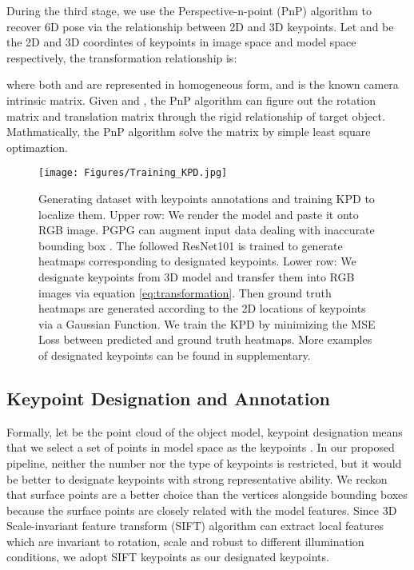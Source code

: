 \documentclass[10pt,twocolumn,letterpaper]{article}
\begin{document}
During the third stage, we use the Perspective-n-point (PnP) \cite{Lepetit2008EPnPAA} algorithm to recover 6D pose via the relationship between 2D and 3D keypoints. Let  and  be the 2D and 3D coordintes of keypoints in image space and model space respectively, the transformation relationship is:

where both  and  are represented in homogeneous form, and  is the known camera intrinsic matrix. Given  and , the PnP algorithm can figure out the rotation matrix  and translation matrix  through the rigid relationship of target object. Mathmatically, the PnP algorithm solve the matrix  by simple least square optimaztion.

\begin{figure*}[t]
\begin{center}
   \texttt{[image: Figures/Training\_KPD.jpg]}
\end{center}
   \caption{Generating dataset with keypoints annotations and training KPD to localize them. Upper row: We render the model and paste it onto RGB image. PGPG can augment input data dealing with inaccurate bounding box \cite{fang2017rmpe}. The followed ResNet101 is trained to generate heatmaps corresponding to  designated keypoints. Lower row: We designate keypoints from 3D model and transfer them into RGB images via equation \ref{eq:transformation}. Then  ground truth heatmaps are generated according to the 2D locations of  keypoints via a Gaussian Function. We train the KPD by minimizing the MSE Loss between predicted and ground truth heatmaps. More examples of designated keypoints can be found in supplementary.}
\label{fig:training_kpd}
\end{figure*}
\subsection{Keypoint Designation and Annotation}
\label{sec:Synthetic_dataset}


Formally, let  be the point cloud of the object model, keypoint designation means that we select a set of points in model space as the keypoints . In our proposed pipeline, neither the number nor the type of keypoints is restricted, but it would be better to designate keypoints with strong representative ability. We reckon that surface points are a better choice than the vertices alongside bounding boxes because the surface points are closely related with the model features. Since 3D Scale-invariant feature transform (SIFT) algorithm \cite{Scovanner:2007:SDA:1291233.1291311} can extract local features which are invariant to rotation, scale and robust to different illumination conditions, we adopt SIFT keypoints as our designated keypoints.
\end{document}

